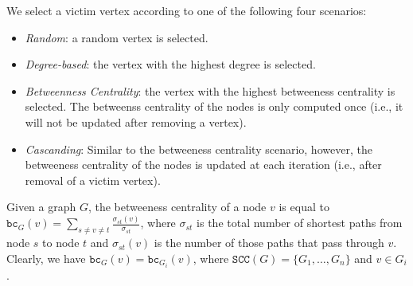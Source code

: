 We select a victim vertex according to one of the following four scenarios: 
\begin{itemize}
\item \emph{Random}: a random vertex is selected.
\item \emph{Degree-based}: the vertex with the highest degree is selected. 
\item \emph{Betweenness Centrality}: the vertex with the highest betweeness centrality is selected. The betweenss centrality of the nodes is only computed once (i.e., it will not be updated after removing a vertex). 
\item \emph{Cascanding}: Similar to the betweeness centrality scenario, however, the betweeness centrality of the nodes is updated at each iteration (i.e., after removal of a victim vertex).
\end{itemize}

Given a graph $G$, the betweeness centrality of a node $v$ is equal to $\mathtt{bc}_G(v) = \sum_{s \neq v \neq t} \frac{\sigma_{st}(v)}{\sigma_{st}}$, where  
$\sigma_{st}$ is the total number of shortest paths from node 
$s$ to node $t$ and $\sigma_{st}(v)$ is the number of those paths that pass through $v$. Clearly, we have 
$\mathtt{bc}_G(v) = \mathtt{bc}_{G_i}(v)$, where $\mathtt{SCC}(G) = \{G_1, \ldots, G_n\}$  and $v \in G_i$. 


